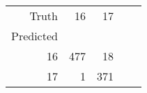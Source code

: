 \begin{table}[h]
\centering
\label{table:5}
\begin{tabular}{rrrrr}
\toprule
Truth & 16 & 17 \\
Predicted &  &  \\
\midrule
16 & 477 & 18 \\
17 & 1 & 371 \\
\bottomrule
\end{tabular}
\end{table}

